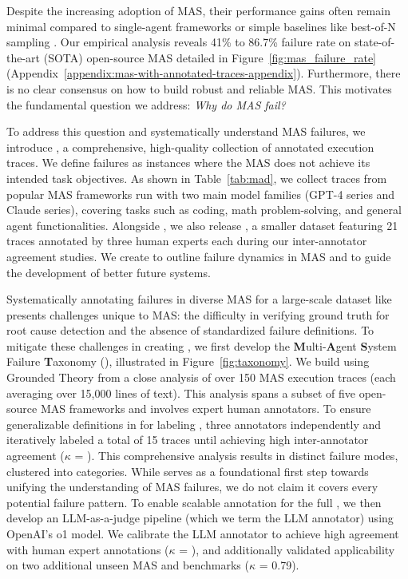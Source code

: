 Despite the increasing adoption of MAS, their performance gains often remain minimal compared to single-agent frameworks \cite{xia2024agentlessdemystifyingllmbasedsoftware} or simple baselines like best-of-N sampling \cite{kapoor2024aiagentsmatter}.
Our empirical analysis reveals 41\% to 86.7\% failure rate on \numMASDomain state-of-the-art (SOTA) open-source MAS detailed in Figure~\ref{fig:mas_failure_rate} (Appendix~\ref{appendix:mas-with-annotated-traces-appendix}).
Furthermore, there is no clear consensus on how to build robust and reliable MAS.
This motivates the fundamental question we address: \textit{Why do MAS fail?}

To address this question and systematically understand MAS failures, we introduce \dataset{}, a comprehensive, high-quality collection of \numTraceInMAD{} annotated execution traces. We define failures as instances where the MAS does not achieve its intended task objectives. As shown in Table~\ref{tab:mad}, we collect traces from \numMASDomain popular MAS frameworks run with two main model families (GPT-4 series and Claude series), covering tasks such as coding, math problem-solving, and general agent functionalities. Alongside \dataset{}, we also release \datasetHuman{}, a smaller dataset featuring 21 traces annotated by three human experts each during our inter-annotator agreement studies. We create \dataset{} to outline failure dynamics in MAS and to guide the development of better future systems.

Systematically annotating failures in diverse MAS for a large-scale dataset like \dataset{} presents challenges unique to MAS: the difficulty in verifying ground truth for root cause detection and the absence of standardized failure definitions. To mitigate these challenges in creating \dataset{}, we first develop the \textbf{M}ulti-\textbf{A}gent \textbf{S}ystem Failure \textbf{T}axonomy (\taxonomy{}), illustrated in Figure~\ref{fig:taxonomy}. We build \taxonomy{} using Grounded Theory \citep{glaser1967discovery} from a close analysis of over 150 MAS execution traces (each averaging over 15,000 lines of text). This analysis spans a subset of five open-source MAS frameworks and involves \numAnnotatorBreadth{} expert human annotators. To ensure generalizable definitions in \taxonomy{} for labeling \dataset{}, three annotators independently and iteratively labeled a total of 15 traces until achieving high inter-annotator agreement ($\kappa$  = \cohenskappainterannotatoraverage{}). This comprehensive analysis results in \numFailureMode{} distinct failure modes, clustered into \numFailureArea{} categories. While \taxonomy{} serves as a foundational first step towards unifying the understanding of MAS failures, we do not claim it covers every potential failure pattern. To enable scalable annotation for the full \dataset{}, we then develop an LLM-as-a-judge pipeline (which we term the LLM annotator) \cite{zheng2023judgingllmasajudgemtbenchchatbot} using OpenAI's o1 model. We calibrate the LLM annotator to achieve high agreement with human expert annotations ($\kappa$ = \cohenskappallm{}), and additionally validated applicability on two additional unseen MAS and benchmarks ($\kappa$ = 0.79).

